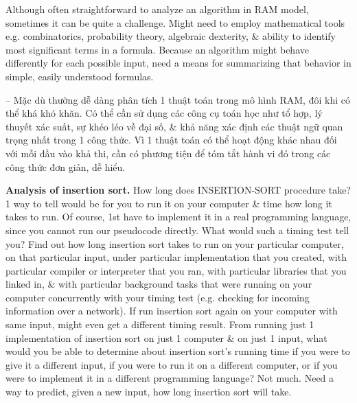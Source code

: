 \documentclass{article}
\begin{document}
\begin{itemize}
\begin{itemize}
\begin{itemize}
            Although often straightforward to analyze an algorithm in RAM model, sometimes it can be quite a challenge. Might need to employ mathematical tools e.g. combinatorics, probability theory, algebraic dexterity, \& ability to identify most significant terms in a formula. Because an algorithm might behave differently for each possible input, need a means for summarizing that behavior in simple, easily understood formulas.
            
            -- Mặc dù thường dễ dàng phân tích 1 thuật toán trong mô hình RAM, đôi khi có thể khá khó khăn. Có thể cần sử dụng các công cụ toán học như tổ hợp, lý thuyết xác suất, sự khéo léo về đại số, \& khả năng xác định các thuật ngữ quan trọng nhất trong 1 công thức. Vì 1 thuật toán có thể hoạt động khác nhau đối với mỗi đầu vào khả thi, cần có phương tiện để tóm tắt hành vi đó trong các công thức đơn giản, dễ hiểu.
            
            {\bf Analysis of insertion sort.} How long does INSERTION-SORT procedure take? 1 way to tell would be for you to run it on your computer \& time how long it takes to run. Of course, 1st have to implement it in a real programming language, since you cannot run our pseudocode directly. What would such a timing test tell you? Find out how long insertion sort takes to run on your particular computer, on that particular input, under particular implementation that you created, with particular compiler or interpreter that you ran, with particular libraries that you linked in, \& with particular background tasks that were running on your computer concurrently with your timing test (e.g. checking for incoming information over a network). If run insertion sort again on your computer with same input, might even get a different timing result.  From running just 1 implementation of insertion sort on just 1 computer \& on just 1 input, what would you be able to determine about insertion sort's running time if you were to give it a different input, if you were to run it on a different computer, or if you were to implement it in a different programming language? Not much. Need a way to predict, given a new input, how long insertion sort will take.
            

\end{itemize}
\end{itemize}
\end{itemize}
\end{document}
